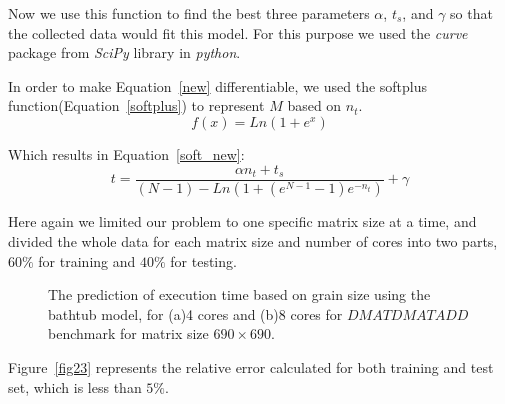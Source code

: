 Now we use this function to find the best three parameters $\alpha$, $t_s$, and $\gamma$ so that the collected data would fit this model. For this purpose we used the \textit{curve} package from \textit{SciPy} library in \textit{python}.

In order to make Equation~\ref{new} differentiable, we used the softplus function(Equation~\ref{softplus}) to represent $M$ based on $n_t$.
\begin{equation}\label{softplus}
f(x)=Ln(1+e^x)
\end{equation}

Which results in Equation~\ref{soft_new}:
\begin{equation}\label{soft_new}
t=\frac{\alpha{n_t}+t_s}{(N-1)-Ln(1+(e^{N-1}-1)e^{-n_t})}+\gamma
\end{equation}

Here again we limited our problem to one specific matrix size at a time, and divided the whole data for each matrix size and number of cores into two parts, $60\%$ for training and $40\%$ for testing.


\vspace{\baselineskip}	
\begin{figure}[H]
	\centering
	\caption{The prediction of execution time based on grain size using the bathtub model, for (a)4 cores and (b)8 cores for $DMATDMATADD$ benchmark for matrix size $690\times690$.}	
	\label{fig22}
\end{figure}
\vspace{\baselineskip}	
Figure~\ref{fig23} represents the relative error calculated for both training and test set, which is less than $5\%$.


